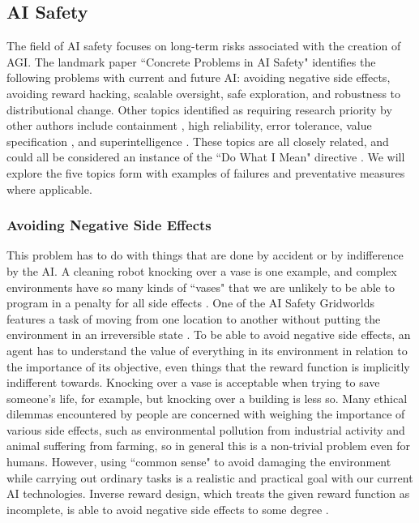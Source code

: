 \documentclass[11pt]{article}
\begin{document}
\subsection{AI Safety}

The field of AI safety focuses on long-term risks associated with the creation of AGI. The landmark
paper ``Concrete Problems in AI Safety" \cite{amodei2016concrete} identifies the following problems
with current and future AI: avoiding negative side effects, avoiding reward hacking, scalable
oversight, safe exploration, and robustness to distributional change. Other topics identified as
requiring research priority by other authors include containment \cite{james2016containment},
high reliability, error tolerance, value specification \cite{soares2017foundations}
\cite{hadfieldmenell2020inverse}, and superintelligence \cite{bostrom2001extinction}
\cite{bostrum2014superintelligence}. These topics are all closely related, and could all be
considered an instance of the ``Do What I Mean" directive \cite{yudkowsky2011dwim}. We will explore
the five topics form \cite{amodei2016concrete} with examples of failures and preventative measures
where applicable. 

\subsubsection{Avoiding Negative Side Effects}

This problem has to do with things that are done by accident or by indifference by the AI. A
cleaning robot knocking over a vase is one example, and complex environments have so many kinds of
``vases" that we are unlikely to be able to program in a penalty for all side effects
\cite{amodei2016concrete}. One of the AI Safety Gridworlds features a task of moving from one
location to another without putting the environment in an irreversible state
\cite{leike2017gridworlds}. To be able to avoid negative side effects, an agent has to understand
the value of everything in its environment in relation to the importance of its objective, even
things that the reward function is implicitly indifferent towards. Knocking over a vase is acceptable
when trying to save someone's life, for example, but knocking over a building is less so. Many
ethical dilemmas encountered by people are concerned with weighing the importance of various side
effects, such as environmental pollution from industrial activity and animal suffering from farming,
so in general this is a non-trivial problem even for humans. However, using ``common sense" to avoid
damaging the environment while carrying out ordinary tasks is a realistic and practical goal with
our current AI technologies. Inverse reward design, which treats the given reward function as
incomplete, is able to avoid negative side effects to some degree \cite{hadfieldmenell2020inverse}.
\end{document}
